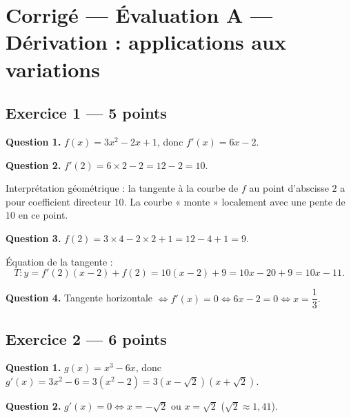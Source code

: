 
\section*{Corrigé — Évaluation A — Dérivation : applications aux variations}

\subsection*{Exercice 1 — 5 points}


\textbf{Question 1.}
$f(x) = 3x^2 - 2x + 1$, donc $f'(x) = 6x - 2.$

\textbf{Question 2.}
$f'(2) = 6 \times 2 - 2 = 12 - 2 = 10.$

Interprétation géométrique : la tangente à la courbe de $f$ au point d'abscisse $2$ a pour coefficient directeur $10$. La courbe « monte » localement avec une pente de $10$ en ce point.

\textbf{Question 3.}
$f(2) = 3 \times 4 - 2 \times 2 + 1 = 12 - 4 + 1 = 9.$

Équation de la tangente :
\[
T : y = f'(2)(x - 2) + f(2) = 10(x-2) + 9 = 10x - 20 + 9 = 10x - 11.
\]

\textbf{Question 4.}
Tangente horizontale $\Leftrightarrow f'(x) = 0 \Leftrightarrow 6x - 2 = 0 \Leftrightarrow x = \dfrac{1}{3}.$

\subsection*{Exercice 2 — 6 points}


\textbf{Question 1.}
$g(x) = x^3 - 6x$, donc $g'(x) = 3x^2 - 6 = 3(x^2 - 2) = 3(x - \sqrt{2})(x + \sqrt{2}).$

\textbf{Question 2.}
$g'(x) = 0 \Leftrightarrow x = -\sqrt{2}$ ou $x = \sqrt{2}$ \quad ($\sqrt{2} \approx 1{,}41$).

